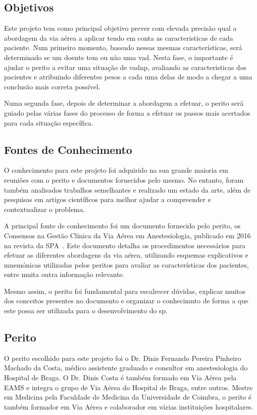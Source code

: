 \documentclass[a4paper,12pt,twoside]{article}
\begin{document}
    \subsection{Objetivos}
    Este projeto tem como principal objetivo prever com elevada precisão qual a abordagem da via aérea a aplicar tendo em conta as caracteristicas de cada paciente. Num primeiro momento, baseado nessas mesmas características, será determinado se um doente tem ou não uma \gls{vad}. Nesta fase, o importante é ajudar o perito a evitar uma situação de \gls{vadnp}, avaliando as caracteristicas dos pacientes e atribuindo diferentes pesos a cada uma delas de modo a chegar a uma conclusão mais correta possível.
    
    Numa segunda fase, depois de determinar a abordagem a efetuar, o perito será guiado pelas várias fases do processo de forma a efetuar os passos mais acertados para cada situação específica.

    \subsection{Fontes de Conhecimento}

    O conhecimento para este projeto foi adquirido na sua grande maioria em reuniões com o perito e documentos fornecidos pelo mesmo. No entanto, foram também analisados trabalhos semelhantes e realizado um estado da arte, além de pesquisas em artigos científicos para melhor ajudar a compreender e contextualizar o problema.

    A principal fonte de conhecimento foi um documento fornecido pelo perito, os Consensos na Gestão Clínica da Via Aérea em Anestesiologia, publicado em 2016 na revista da \gls{SPA}~\cite{consensosva}. Este documento detalha os procedimentos necessários para efetuar as diferentes abordagens da via aérea, utilizando esquemas explicativos e mnemónicas utilizadas pelos peritos para avaliar as características dos pacientes, entre muita outra informação relevante.

    Mesmo assim, o perito foi fundamental para escalrecer dúvidas, explicar muitos dos conceitos presentes no documento e organizar o conhecimnto de forma a que este possa ser utilizada para o desenvolvimento do \gls{sp}.

    \subsection{Perito}

    O perito escolhido para este projeto foi o Dr. Dinis Fernando Pereira Pinheiro Machado da Costa, médico assistente graduado e consultor em anestesiologia do Hospital de Braga. O Dr. Dinis Costa é também formado em Via Aérea pela \gls{EAMS} e integra o grupo de Via Aérea do Hospital de Braga, entre outros. Mestre em Medicina pela Faculdade de Medicina da Universidade de Coimbra, o perito é também formador em Via Aérea e colaborador em várias instituições hospitalares.
\end{document}

